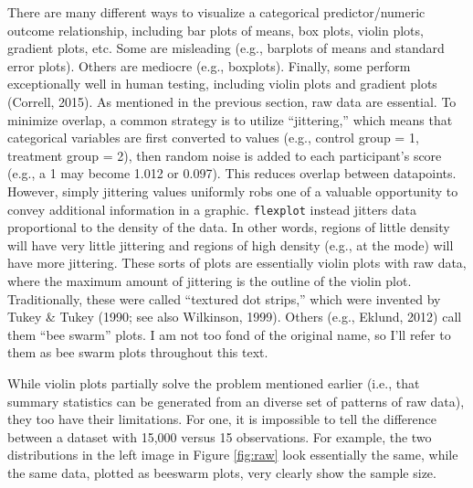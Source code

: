 \documentclass[
  doc]{apa6}
\begin{document}
There are many different ways to visualize a categorical predictor/numeric outcome relationship, including bar plots of means, box plots, violin plots, gradient plots, etc. Some are misleading (e.g., barplots of means and standard error plots). Others are mediocre (e.g., boxplots). Finally, some perform exceptionally well in human testing, including violin plots and gradient plots (Correll, 2015). As mentioned in the previous section, raw data are essential. To minimize overlap, a common strategy is to utilize \enquote{jittering,} which means that categorical variables are first converted to values (e.g., control group = 1, treatment group = 2), then random noise is added to each participant's score (e.g., a 1 may become 1.012 or 0.097). This reduces overlap between datapoints. However, simply jittering values uniformly robs one of a valuable opportunity to convey additional information in a graphic. \texttt{flexplot} instead jitters data proportional to the density of the data. In other words, regions of little density will have very little jittering and regions of high density (e.g., at the mode) will have more jittering. These sorts of plots are essentially violin plots with raw data, where the maximum amount of jittering is the outline of the violin plot. Traditionally, these were called \enquote{textured dot strips,} which were invented by Tukey \& Tukey (1990; see also Wilkinson, 1999). Others (e.g., Eklund, 2012) call them \enquote{bee swarm} plots. I am not too fond of the original name, so I'll refer to them as bee swarm plots throughout this text.

While violin plots partially solve the problem mentioned earlier (i.e., that summary statistics can be generated from an diverse set of patterns of raw data), they too have their limitations. For one, it is impossible to tell the difference between a dataset with 15,000 versus 15 observations. For example, the two distributions in the left image in Figure \ref{fig:raw} look essentially the same, while the same data, plotted as beeswarm plots, very clearly show the sample size.
\end{document}

